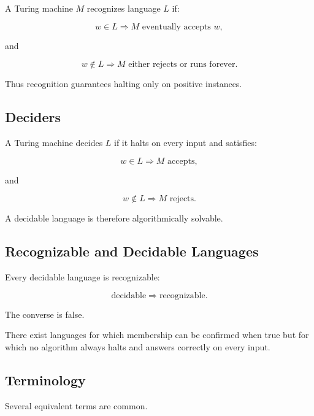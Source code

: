 A Turing machine \(M\) recognizes language \(L\) if:

\[
w\in L
\Longrightarrow
M
\text{ eventually accepts }w,
\]

and

\[
w\notin L
\Longrightarrow
M
\text{ either rejects or runs forever}.
\]

Thus recognition guarantees halting only on positive instances.

\subsection{Deciders}
\label{subsec:turing-deciders}

A Turing machine decides \(L\) if it halts on every input and satisfies:

\[
\boxed{
w\in L
\Longrightarrow
M
\text{ accepts},
}
\]

and

\[
\boxed{
w\notin L
\Longrightarrow
M
\text{ rejects}.
}
\]

A decidable language is therefore algorithmically solvable.

\subsection{Recognizable and Decidable Languages}
\label{subsec:recognizable-decidable}

Every decidable language is recognizable:

\[
\boxed{
\text{decidable}
\Longrightarrow
\text{recognizable}.
}
\]

The converse is false.

There exist languages for which membership can be confirmed when true but
for which no algorithm always halts and answers correctly on every input.

\subsection{Terminology}
\label{subsec:computability-terminology}

Several equivalent terms are common.

